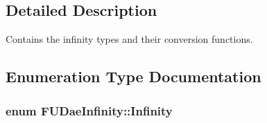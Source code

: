 \subsection{Detailed Description}
Contains the infinity types and their conversion functions. 

\subsection{Enumeration Type Documentation}
\hypertarget{namespaceFUDaeInfinity_a9d8fb86affe94d1586d728d4c2e89008}{
\subsubsection[{Infinity}]{\setlength{\rightskip}{0pt plus 5cm}enum {\bf FUDaeInfinity::Infinity}}}
\label{namespaceFUDaeInfinity_a9d8fb86affe94d1586d728d4c2e89008}
